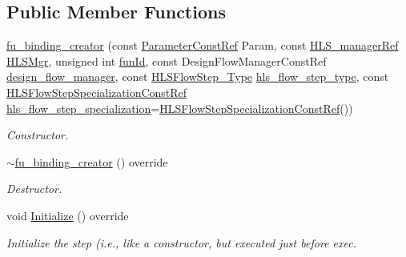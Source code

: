 \subsection*{Public Member Functions}
\begin{DoxyCompactItemize}
\item 
\hyperlink{classfu__binding__creator_aec180b9caaba0f0d3835564106dd690e}{fu\+\_\+binding\+\_\+creator} (const \hyperlink{Parameter_8hpp_a37841774a6fcb479b597fdf8955eb4ea}{Parameter\+Const\+Ref} Param, const \hyperlink{hls__manager_8hpp_acd3842b8589fe52c08fc0b2fcc813bfe}{H\+L\+S\+\_\+manager\+Ref} \hyperlink{classHLS__step_ade85003a99d34134418451ddc46a18e9}{H\+L\+S\+Mgr}, unsigned int \hyperlink{classHLSFunctionStep_a3e6434fd86c698b0c70520b859bff5b0}{fun\+Id}, const Design\+Flow\+Manager\+Const\+Ref \hyperlink{classDesignFlowStep_ab770677ddf087613add30024e16a5554}{design\+\_\+flow\+\_\+manager}, const \hyperlink{hls__step_8hpp_ada16bc22905016180e26fc7e39537f8d}{H\+L\+S\+Flow\+Step\+\_\+\+Type} \hyperlink{classHLS__step_aefd59af15346ec3f10bf12bd756e6777}{hls\+\_\+flow\+\_\+step\+\_\+type}, const \hyperlink{hls__step_8hpp_a5fdd2edf290c196531d21d68e13f0e74}{H\+L\+S\+Flow\+Step\+Specialization\+Const\+Ref} \hyperlink{classHLS__step_a843be75ba53b81876aa3c8b870ae8a55}{hls\+\_\+flow\+\_\+step\+\_\+specialization}=\hyperlink{hls__step_8hpp_a5fdd2edf290c196531d21d68e13f0e74}{H\+L\+S\+Flow\+Step\+Specialization\+Const\+Ref}())
\begin{DoxyCompactList}\small\item\em Constructor. \end{DoxyCompactList}\item 
\hyperlink{classfu__binding__creator_a74adf93129e86cb5ee7e62cc0637f6c5}{$\sim$fu\+\_\+binding\+\_\+creator} () override
\begin{DoxyCompactList}\small\item\em Destructor. \end{DoxyCompactList}\item 
void \hyperlink{classfu__binding__creator_a4a4645ca4839bcf172824e2c725f4219}{Initialize} () override
\begin{DoxyCompactList}\small\item\em Initialize the step (i.\+e., like a constructor, but executed just before exec. \end{DoxyCompactList}\end{DoxyCompactItemize}
